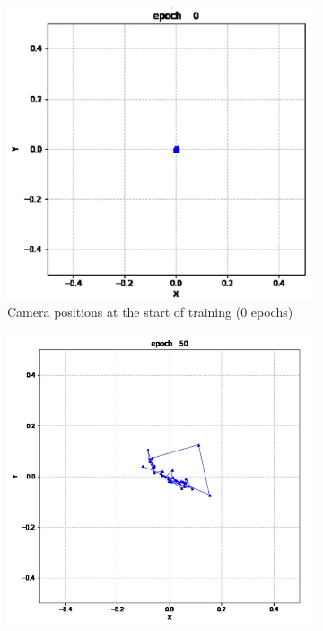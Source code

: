 \begin{figure}[H]
    \centering
    \begin{subfigure}{.47\textwidth} %
        \includegraphics[width=\textwidth]{img/Results/Dataset_3/Camera/0 Epoch.png}
        \caption{Camera positions at the start of training (0 epochs)}
        \label{fig:Image1}
    \end{subfigure}
    \hfill
    \begin{subfigure}{.47\textwidth} %
        \includegraphics[width=\textwidth]{img/Results/Dataset_3/Camera/50 epochs.png}

\end{subfigure}
\end{figure}
